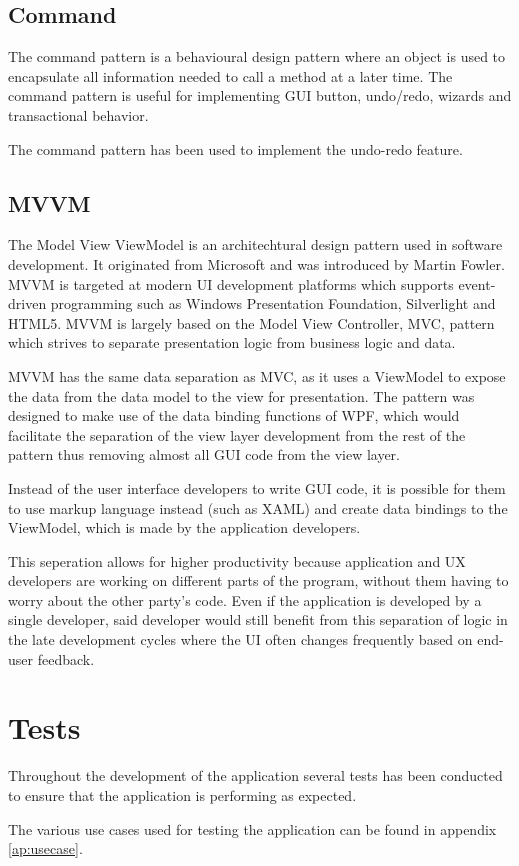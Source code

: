 \subsection{Command}
The command pattern is a behavioural design pattern where an object is used to encapsulate all information needed to call a method at a later time.
The command pattern is useful for implementing GUI button, undo/redo, wizards and transactional behavior.

The command pattern has been used to implement the undo-redo feature.

\subsection{MVVM}
The Model View ViewModel is an architechtural design pattern used in software development. It originated from Microsoft and was introduced by Martin Fowler.
MVVM is targeted at modern UI development platforms which supports event-driven programming such as Windows Presentation Foundation, Silverlight and HTML5.
MVVM is largely based on the Model View Controller, MVC, pattern which strives to separate presentation logic from business logic and data.

MVVM has the same data separation as MVC, as it uses a ViewModel to expose the data from the data model to the view for presentation.
The pattern was designed to make use of the data binding functions of WPF, which would facilitate the separation of the view layer development
from the rest of the pattern thus removing almost all GUI code from the view layer.

Instead of the user interface developers to write GUI code, it is possible for them to use markup language instead (such as XAML)
and create data bindings to the ViewModel, which is made by the application developers.

This seperation allows for higher productivity because application and UX developers are working on different parts of the program, 
without them having to worry about the other party's code.
Even if the application is developed by a single developer, said developer would still benefit from this separation of logic 
in the late development cycles where the UI often changes frequently based on end-user feedback.

\section{Tests}
\label{sec:tests}
Throughout the development of the application several tests has been conducted to ensure that the application is performing as expected.

The various use cases used for testing the application can be found in appendix \ref{ap:usecase}.